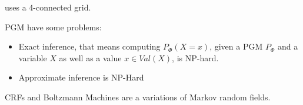 \cite{shotton2006textonboost} uses a 4-connected grid.

\Gls{PGM} have some problems:

\begin{itemize}
    \item Exact inference, that means computing \(P_\Phi(X=x)\), given a
          \Gls{PGM} $P_\Phi$ and a variable \(X\) as well as a value \(x \in Val(X)\),
          is NP-hard.
    \item Approximate inference is NP-Hard
\end{itemize}














\Glspl{CRF} and Boltzmann Machines are a variations of Markov random fields.

%


